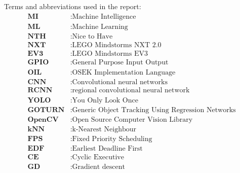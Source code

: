 
Terms and abbreviations used in the report:
\begin{align*}
    \textbf{MI} &: \text{Machine Intelligence} \\
    \textbf{ML} &: \text{Machine Learning} \\
    \textbf{NTH} &: \text{Nice to Have} \\
    \textbf{NXT} &: \text{LEGO Mindstorms NXT 2.0} \\
    \textbf{EV3} &: \text{LEGO Mindstorms EV3} \\  
    \textbf{GPIO} &: \text{General Purpose Input Output} \\
    \textbf{OIL} &: \text{OSEK Implementation Language} \\
    \textbf{CNN} &: \text{Convolutional neural networks} \\ 
    \textbf{RCNN} &: \text{regional convolutional neural network} \\ 
    \textbf{YOLO} &: \text{You Only Look Once} \\ 
    \textbf{GOTURN} &: \text{Generic Object Tracking Using Regression Networks} \\
    \textbf{OpenCV} &: \text{Open Source Computer Vision Library} \\
    \textbf{kNN} &: \text{k-Nearest Neighbour} \\
    \textbf{FPS} &: \text{Fixed Priority Scheduling} \\
    \textbf{EDF} &: \text{Earliest Deadline First} \\
    \textbf{CE} &: \text{Cyclic Executive} \\
    \textbf{GD} &: \text{Gradient descent} \\
\end{align*}
